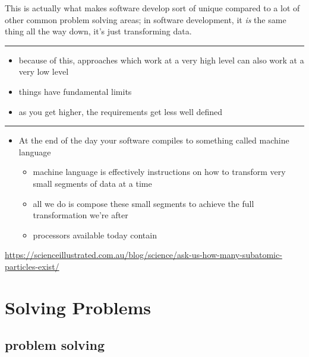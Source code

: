 \documentclass[
]{book}
\providecommand{\tightlist}{%
  \setlength{\itemsep}{0pt}\setlength{\parskip}{0pt}}
\begin{document}
This is actually what makes software develop sort of unique compared to a lot of other common problem solving areas; in software development, it \emph{is} the same thing all the way down, it's just transforming data.

\begin{center}\rule{0.5\linewidth}{0.5pt}\end{center}

\begin{itemize}
\tightlist
\item
  because of this, approaches which work at a very high level can also work at a very low level
\item
  things have fundamental limits
\item
  as you get higher, the requirements get less well defined
\end{itemize}

\begin{center}\rule{0.5\linewidth}{0.5pt}\end{center}

\begin{itemize}
\tightlist
\item
  At the end of the day your software compiles to something called machine language

  \begin{itemize}
  \tightlist
  \item
    machine language is effectively instructions on how to transform very small segments of data at a time
  \item
    all we do is compose these small segments to achieve the full transformation we're after
  \item
    processors available today contain
  \end{itemize}
\end{itemize}

\url{https://scienceillustrated.com.au/blog/science/ask-us-how-many-subatomic-particles-exist/}

\hypertarget{solving-problems}{%
\chapter{Solving Problems}\label{solving-problems}}

\hypertarget{problem-solving}{%
\section{problem solving}\label{problem-solving}}
\end{document}

